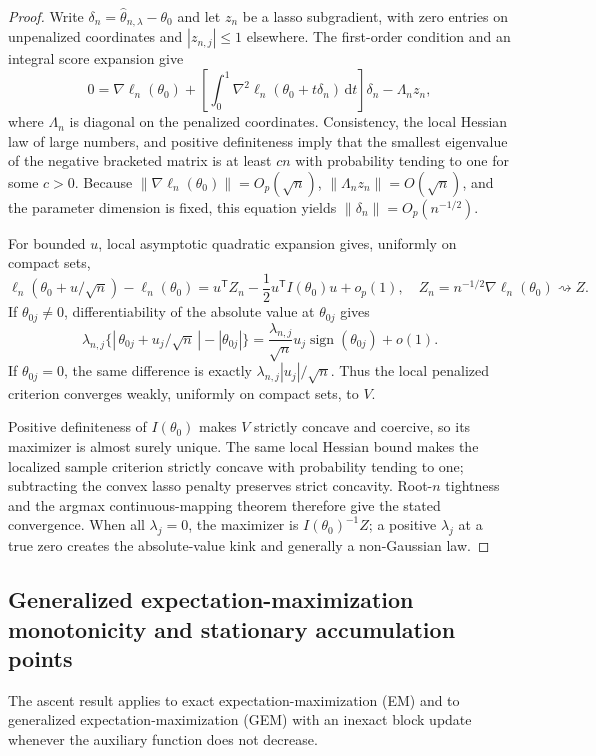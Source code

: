 \documentclass[a4paper,fleqn]{cas-sc}
\newcommand{\T}{\mathsf T}
\numberwithin{equation}{section}
\begin{document}
\begin{proof}
Write $\delta_n=\widehat\theta_{n,\lambda}-\theta_0$ and let $z_n$ be a lasso subgradient, with zero entries on unpenalized coordinates and $|z_{n,j}|\leq1$ elsewhere. The first-order condition and an integral score expansion give
\[
 0=\nabla\ell_n(\theta_0)+
 \left[\int_0^1\nabla^2\ell_n(\theta_0+t\delta_n)\,\mathrm dt\right]\delta_n
 -\Lambda_n z_n,
\]
where $\Lambda_n$ is diagonal on the penalized coordinates. Consistency, the local Hessian law of large numbers, and positive definiteness imply that the smallest eigenvalue of the negative bracketed matrix is at least $cn$ with probability tending to one for some $c>0$. Because $\|\nabla\ell_n(\theta_0)\|=O_p(\sqrt n)$, $\|\Lambda_nz_n\|=O(\sqrt n)$, and the parameter dimension is fixed, this equation yields $\|\delta_n\|=O_p(n^{-1/2})$.

For bounded $u$, local asymptotic quadratic expansion gives, uniformly on compact sets,
\[
 \ell_n(\theta_0+u/\sqrt n)-\ell_n(\theta_0)
 =u^\T Z_n-\frac12u^\T I(\theta_0)u+o_p(1),
 \quad Z_n=n^{-1/2}\nabla\ell_n(\theta_0)\rightsquigarrow Z.
\]
If $\theta_{0j}\neq0$, differentiability of the absolute value at $\theta_{0j}$ gives
\[
 \lambda_{n,j}\{|\,\theta_{0j}+u_j/\sqrt n\,|-|\theta_{0j}|\}
 =\frac{\lambda_{n,j}}{\sqrt n}
 u_j\operatorname{sign}(\theta_{0j})+o(1).
\]
If $\theta_{0j}=0$, the same difference is exactly
$\lambda_{n,j}|u_j|/\sqrt n$. Thus the local penalized criterion converges weakly, uniformly on compact sets, to $V$.

Positive definiteness of $I(\theta_0)$ makes $V$ strictly concave and coercive, so its maximizer is almost surely unique. The same local Hessian bound makes the localized sample criterion strictly concave with probability tending to one; subtracting the convex lasso penalty preserves strict concavity. Root-$n$ tightness and the argmax continuous-mapping theorem therefore give the stated convergence. When all $\lambda_j=0$, the maximizer is $I(\theta_0)^{-1}Z$; a positive $\lambda_j$ at a true zero creates the absolute-value kink and generally a non-Gaussian law.
\end{proof}

\subsection{Generalized expectation-maximization monotonicity and stationary accumulation points}

The ascent result applies to exact expectation-maximization (EM) and to generalized expectation-maximization (GEM) with an inexact block update whenever the auxiliary function does not decrease.
\end{document}
